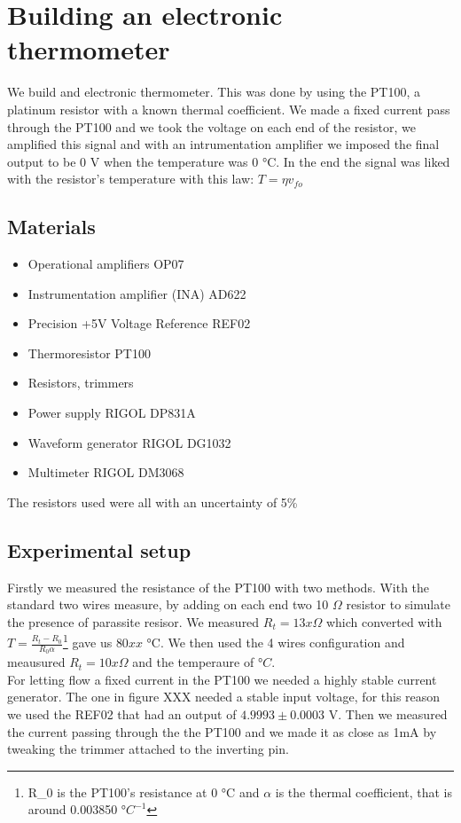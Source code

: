 \chapter{Building an electronic thermometer}
We build and electronic thermometer. This was done by using the PT100, a platinum resistor with a known thermal coefficient. We made a fixed current pass through the PT100 and we took the voltage on each end of the resistor, we amplified this signal and with an intrumentation amplifier we imposed the final output to be 0 V when the temperature was 0 °C. In the end the signal was liked with the resistor's temperature with this law: $T = \eta v_{fo}$


\section{Materials}
\begin{itemize}
\item Operational amplifiers OP07
\item Instrumentation amplifier (INA) AD622
\item Precision +5V Voltage Reference REF02
\item Thermoresistor PT100
\item Resistors, trimmers
\item Power supply RIGOL DP831A
\item Waveform generator RIGOL DG1032
\item Multimeter RIGOL DM3068
\end{itemize}
The resistors used were all with an uncertainty of 5\%
\section{Experimental setup}
Firstly we measured the resistance of the PT100 with two methods. With the standard two wires measure, by adding on each end two 10 $\Omega$ resistor to simulate the presence of parassite resisor. We measured $R_t = 13x \Omega$ which converted with $T = \frac{R_t - R_0}{R_0 \alpha}$\footnote{R_0 is the PT100's resistance at 0 °C and $\alpha$ is the thermal coefficient, that is around 0.003850 $°C^{-1}$} gave us $80 xx$ °C. We then used the 4 wires configuration and meausured $R_t = 10x \Omega$ and the temperaure of  $ °C$.\\

For letting flow a fixed current in the PT100 we needed a highly stable current generator. The one in figure XXX needed a stable input voltage, for this  reason we used the REF02 that had an output of $4.9993 \pm 0.0003$ V. Then we measured the current passing through the the PT100 and we made it as close as 1mA by tweaking the trimmer attached to the inverting pin.\\

